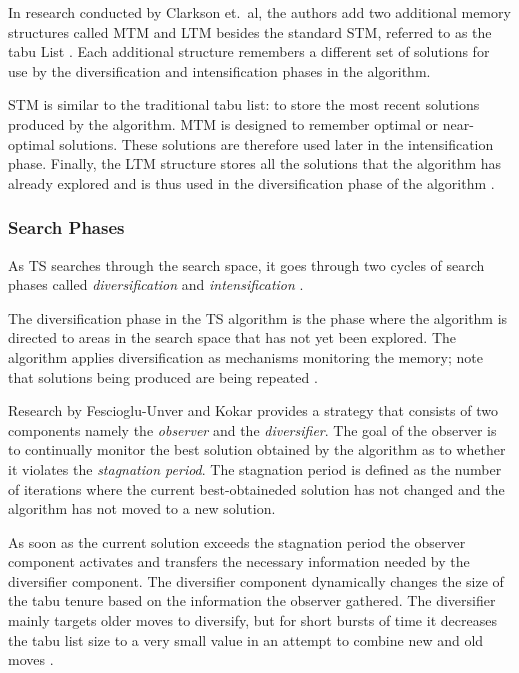 In research conducted by Clarkson et.\ al\cite{MultiObjTabu}, the authors add two additional memory structures called \gls{MTM} and \gls{LTM} besides the standard \gls{STM}, referred to as the tabu List \cite{MultiObjTabu}. Each additional structure remembers a different set of solutions for use by the diversification and intensification phases in the algorithm.

STM is similar to the traditional tabu list: to store the most recent solutions produced by the algorithm. \gls{MTM} is designed to remember optimal or near-optimal solutions. These solutions are therefore used later in the intensification phase. Finally, the \gls{LTM} structure stores all the solutions that the algorithm has already explored and is thus used in the diversification phase of the algorithm \cite{MultiObjTabu}.

\subsubsection{Search Phases}
\label{TSSearchPhases}
As \gls{TS} searches through the search space, it goes through two cycles of search phases called \emph{diversification} and \emph{intensification} \cite{TabuParameterization,TabuCrewSchedulingProblem,NonlinearGlobalTabu,SelfControllingReactiveTabu}.

The diversification phase in the \gls{TS} algorithm is the phase where the algorithm is directed to areas in the search space that has not yet been explored. The algorithm applies diversification as mechanisms monitoring the memory; note that solutions being produced are being repeated \cite{ReactiveTabuVHR,SelfControllingReactiveTabu}. 

Research by Fescioglu-Unver and Kokar \cite{SelfControllingReactiveTabu} provides a strategy that consists of two components namely the \emph{observer} and the \emph{diversifier}. The goal of the observer is to continually monitor the best solution obtained by the algorithm as to whether it violates the \emph{stagnation period}. The stagnation period is defined as the number of iterations where the current best-obtaineded solution has not changed and the algorithm has not moved to a new solution\cite{SelfControllingReactiveTabu}. 

As soon as the current solution exceeds the stagnation period the observer component activates and transfers the necessary information needed by the diversifier component. The diversifier component dynamically changes the size of the tabu tenure based on the information the observer gathered. The diversifier mainly targets older moves to diversify, but for short bursts of time it decreases the tabu list size to a very small value in an attempt to combine new and old moves \cite{SelfControllingReactiveTabu}.

